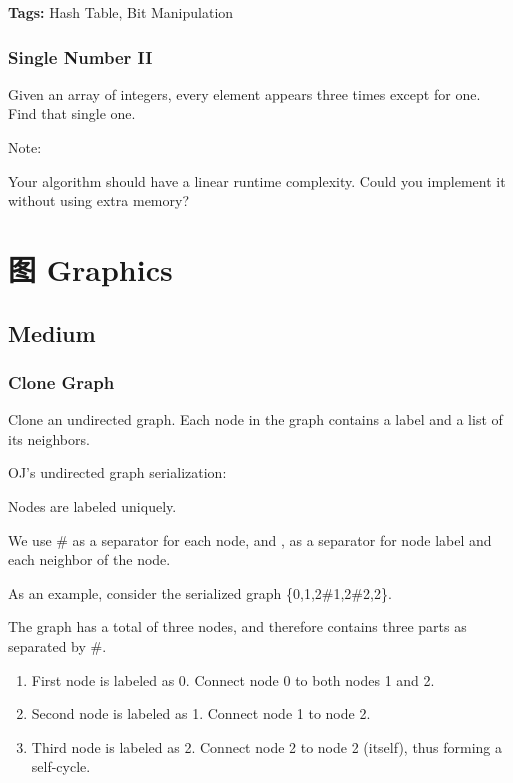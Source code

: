 \documentclass[12pt]{book}
\begin{document}
\textbf{Tags:} Hash Table, Bit Manipulation

\subsection{Single Number II}
\label{sec-17-2-3}
Given an array of integers, every element appears three times except for one. Find that single one.

Note:

Your algorithm should have a linear runtime complexity. Could you implement it without using extra memory?

\chapter{图 Graphics}
\label{sec-18}
\section{Medium}
\label{sec-18-1}
\subsection{Clone Graph}
\label{sec-18-1-1}
Clone an undirected graph. Each node in the graph contains a label and a list of its neighbors.

OJ's undirected graph serialization:

Nodes are labeled uniquely.

We use \# as a separator for each node, and , as a separator for node label and each neighbor of the node.

As an example, consider the serialized graph \{0,1,2\#1,2\#2,2\}.

The graph has a total of three nodes, and therefore contains three parts as separated by \#.

\begin{enumerate}
\item First node is labeled as 0. Connect node 0 to both nodes 1 and 2.
\item Second node is labeled as 1. Connect node 1 to node 2.
\item Third node is labeled as 2. Connect node 2 to node 2 (itself), thus forming a self-cycle.
\end{enumerate}
\end{document}
